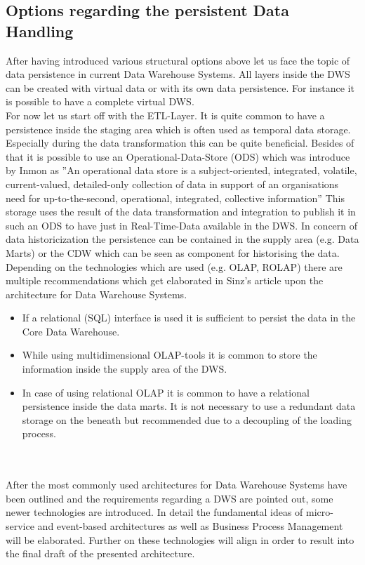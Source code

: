 \subsection{Options regarding the persistent Data Handling}
After having introduced various structural options above let us face the topic of data persistence in current Data Warehouse Systems.
All layers inside the DWS can be created with virtual data or with its own data persistence. For instance it is possible to have a complete virtual DWS.\cite{sinz}\newline
\\
For now let us start off with the ETL-Layer. It is quite common to have a persistence inside the staging area which is often used as temporal data storage. Especially during the data transformation this can be quite beneficial. Besides of that it is possible to use an Operational-Data-Store (ODS) which was introduce by Inmon as ''An operational data store is a subject-oriented, integrated, volatile, current-valued, detailed-only collection of data in support of an organisations need for up-to-the-second, operational, integrated, collective information''\cite{buildingTheDWS} This storage uses the result of the data transformation and integration to publish it in such an ODS to have just in Real-Time-Data available in the DWS.\newline
In concern of data historicization the persistence can be contained in the supply area (e.g. Data Marts) or the CDW which can be seen as component for historising the data. Depending on the technologies which are used (e.g. OLAP, ROLAP) there are multiple recommendations which get elaborated in Sinz's article upon the architecture for Data Warehouse Systems.
\begin{itemize}
    \item If a relational (SQL) interface is used it is sufficient to persist the data in the Core Data Warehouse.
    \item While using multidimensional OLAP-tools it is common to store the information inside the supply area of the DWS.
    \item In case of using relational OLAP it is common to have a relational persistence inside the data marts. It is not necessary to use a redundant data storage on the beneath but recommended due to a decoupling of the loading process. 
\end{itemize}
\cite{sinz}
\\
\\
After the most commonly used architectures for Data Warehouse Systems have been outlined and the requirements regarding a DWS are pointed out, some newer technologies are introduced. In detail the fundamental ideas of micro-service and event-based architectures as well as Business Process Management will be elaborated. Further on these technologies will align in order to result into the final draft of the presented architecture.